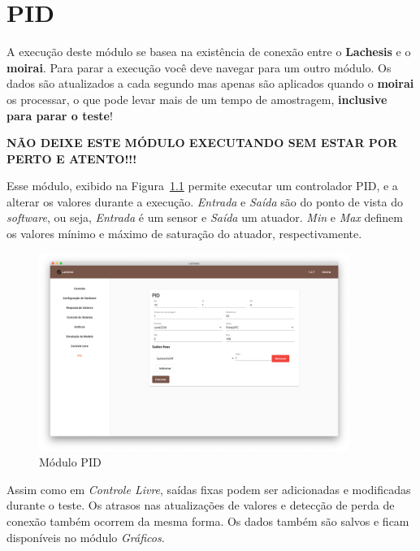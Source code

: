 
\chapter{PID}%
\label{chapter:pid}

\begin{mdframed}[frametitle={Atenção!}]
    A execução deste módulo se basea na existência de conexão entre o
    \textbf{Lachesis} e o \textbf{moirai}. Para parar a execução você deve
    navegar para um outro módulo. Os dados são atualizados a cada segundo mas
    apenas são aplicados quando o \textbf{moirai} os processar, o que pode levar
    mais de um tempo de amostragem, \textbf{inclusive para parar o teste}!

    \textbf{NÃO DEIXE ESTE MÓDULO EXECUTANDO SEM ESTAR POR PERTO E ATENTO!!!}
\end{mdframed}

Esse módulo, exibido na Figura~\ref{fig:pid} permite executar um controlador
PID, e a alterar os valores durante a execução. \textit{Entrada} e
\textit{Saída} são do ponto de vista do \textit{software}, ou seja,
\textit{Entrada} é um sensor e \textit{Saída} um atuador. \textit{Min} e
\textit{Max} definem os valores mínimo e máximo de saturação do atuador,
respectivamente.

\begin{figure}[ht!]
    \centering
    \includegraphics[width=0.9\textwidth]{imgs/pid}
    \caption[Módulo  PID]{Módulo PID}%
    \label{fig:pid}
\end{figure}

Assim como em \textit{Controle Livre}, saídas fixas podem ser adicionadas e
modificadas durante o teste. Os atrasos nas atualizações de valores e detecção
de perda de conexão também ocorrem da mesma forma. Os dados também são salvos e
ficam disponíveis no módulo \textit{Gráficos}.
